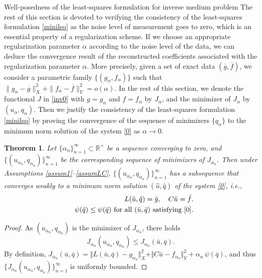 \documentclass[11pt]{article}%
\renewcommand{\_}{{\fontfamily{ptm}\selectfont\textunderscore}}
\theoremstyle{plain}
\numberwithin{equation}{section}
\newtheorem{theorem*}{Theorem}
\begin{document}
\begin{section}{Well-posedness of the least-squares formulation for inverse medium problem}
The rest of this section is devoted to verifying the consistency of the least-squares formulation \eqref{minilsq} as the noise level of measurement goes to zero, which is an essential property of a regularization scheme. If we choose an appropriate regularization parameter $\alpha$ according to the noise level of the data, we can deduce the convergence result of the reconstructed coefficients associated with 
the regularization parameter $\alpha$. 
More precisely, given a set of exact data $(\overline{g}, \overline{f})$, we consider a parametric family $\{(g_\alpha, f_\alpha)\}$ such that $ \| g_\alpha - \overline{g} \|_X^2 +\| f_\alpha - \overline{f} \|_Y^2 = o(\alpha)$. 
In the rest of this section, we denote the functional $J$ in \eqref{inv0} with $g= g_\alpha$ and $f=f_\alpha$ 
by $J_\alpha$, and the minimizer of $J_\alpha$ by $(u_\alpha, q_\alpha)$.
Then we justify the consistency of the least-squares formulation \eqref{minilsq} by proving the convergence of the sequence of minimizers $\{q_\alpha\}$ to the minimum norm solution \cite{ito2015inverse} of the system \eqref{0} as $\alpha\to 0$.
\begin{theorem*}
Let $\{\alpha_n\}_{n=1}^\infty\subset \mathbb{R}^+$ be a sequence converging to zero, and 
$\{(u_{\alpha_n}, q_{\alpha_n})\}_{n=1}^\infty$ be the corresponding sequence of minimizers of $J_{\alpha_n}$. 
Then 
under Assumptions \ref{assum1}--\ref{assumLC}, 
$\{(u_{\alpha_n}, q_{\alpha_n})\}_{n=1}^\infty$ has a subsequence that converges weakly to a minimum norm solution 
$(\hat{u},\hat{q})$ of the system \eqref{0}, i.e., 
\begin{eqnarray*}
&&L(\hat{u},\hat{q})=\bar{g},\quad C\hat{u}=\bar{f}.\\
&&\psi(\hat{q})\le \psi(\bar{q}) \mbox{ for all $(\bar{u},\bar{q})$ satisfying \eqref{0}}.
\end{eqnarray*}
\end{theorem*}
\begin{proof}
As $(u_{\alpha_n},q_{\alpha_n})$ is the minimizer of $J_{\alpha_n}$, there holds
\begin{equation}\label{ineqJ}
J_{\alpha_n}(u_{\alpha_n},q_{\alpha_n})\leq J_{\alpha_n}(\bar{u},\bar{q}).
\end{equation}
By definition, $J_{\alpha_n}(\bar{u},\bar{q})= \Vert L(\bar{u},\bar{q})- g_{\alpha_n}\Vert_{X}^2+\Vert C\bar{u}-f_{\alpha_n}\Vert_{Y}^2+\alpha_n\,\psi(\bar{q})$, and thus $\{J_{\alpha_n}(u_{\alpha_n},q_{\alpha_n})\}_{n=1}^\infty$ is uniformly bounded. 

\end{proof}
\end{section}
\end{document}
